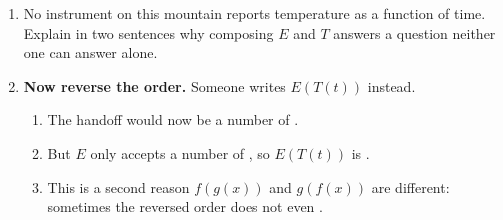 \documentclass[10pt]{article}
\begin{document}
\begin{tcolorbox}[colback=white, colframe=black!40,
    title=\textbf{Tier A --- Approaching Proficiency},
    fonttitle=\bfseries, arc=2mm, left=3mm, right=3mm, top=2mm, bottom=2mm]
\begin{enumerate}[itemsep=8pt]
  \item No instrument on this mountain reports temperature as a function of
        time. Explain in two sentences why composing $E$ and $T$ answers a
        question neither one can answer alone.

        \vspace{0.05in}

  \item \textbf{Now reverse the order.} Someone writes $E(T(t))$ instead.

        \begin{enumerate}[label=(\alph*), itemsep=4pt]
          \item The handoff would now be a number of .
          \item But $E$ only accepts a number of , so
                $E(T(t))$ is .
          \item This is a second reason $f(g(x))$ and $g(f(x))$ are different:
                sometimes the reversed order does not even .
        \end{enumerate}
\end{enumerate}
\end{tcolorbox}

\vspace{0.1in}
\end{document}
